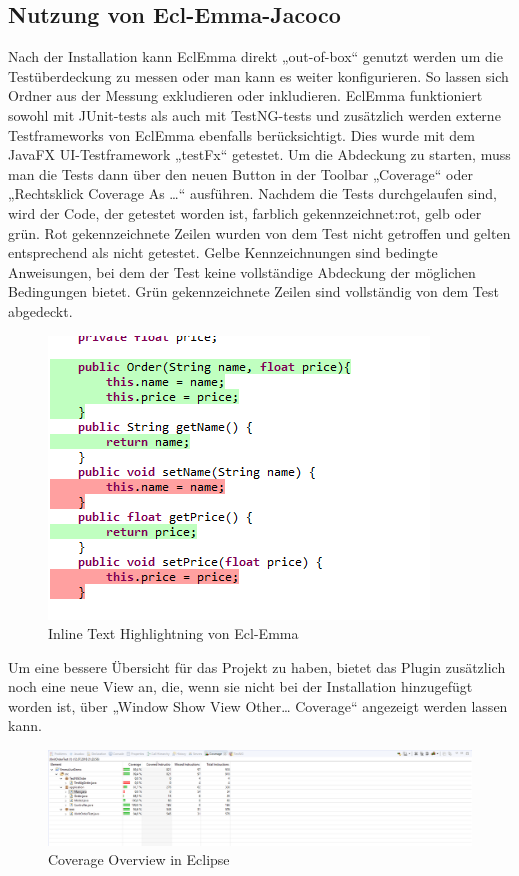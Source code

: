 \documentclass[a4paper]{article}
\begin{document}
\subsection{Nutzung von Ecl-Emma-Jacoco}
Nach der Installation kann EclEmma direkt „out-of-box“ genutzt werden um die Testüberdeckung zu messen oder man kann es weiter konfigurieren. So lassen sich Ordner aus der Messung exkludieren oder inkludieren. EclEmma funktioniert sowohl mit JUnit-tests als auch mit TestNG-tests und zusätzlich werden externe Testframeworks von EclEmma ebenfalls berücksichtigt. Dies wurde mit dem JavaFX UI-Testframework „testFx“ getestet. 
\bigbreak
Um die Abdeckung zu starten, muss man die Tests dann über den neuen Button in der Toolbar „Coverage“ oder „Rechtsklick \textrightarrow{} Coverage As …“ ausführen. Nachdem die Tests durchgelaufen sind, wird der Code, der getestet worden ist, farblich gekennzeichnet:rot, gelb oder grün. Rot gekennzeichnete Zeilen wurden von dem Test nicht getroffen und gelten entsprechend als nicht getestet. Gelbe Kennzeichnungen sind bedingte Anweisungen, bei dem der Test keine vollständige Abdeckung der möglichen Bedingungen bietet. Grün gekennzeichnete Zeilen sind vollständig von dem Test abgedeckt.
\begin{figure}[h]
\includegraphics[scale=1.0]{Highlightning.png}
\caption{Inline Text Highlightning von Ecl-Emma}
\centering
\end{figure}
\bigbreak
Um eine bessere Übersicht für das Projekt zu haben, bietet das Plugin zusätzlich noch eine neue View an, die, wenn sie nicht bei der Installation hinzugefügt worden ist, über „Window \textrightarrow{} Show View \textrightarrow{} Other… \textrightarrow{} Coverage“ angezeigt werden lassen kann. 
\begin{figure}[h]
\includegraphics[scale=0.40]{Coverage_View.png}
\caption{Coverage Overview in Eclipse}
\centering
\end{figure}
\end{document}
